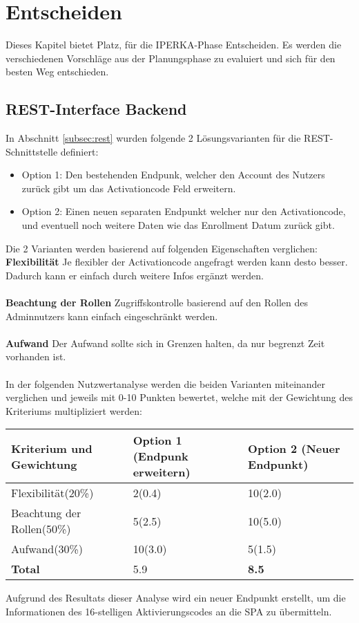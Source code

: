 \chapter{Entscheiden}\label{ch:entscheiden}
Dieses Kapitel bietet Platz, für die IPERKA-Phase \flqq Entscheiden\frqq{}. Es werden die verschiedenen Vorschläge aus der Planungsphase zu evaluiert und sich für den besten Weg entschieden.
\section{REST-Interface Backend}
In Abschnitt \ref{subsec:rest} wurden folgende 2 Lösungsvarianten für die REST-Schnittstelle definiert:
\begin{itemize}
	\item{Option 1:} Den bestehenden Endpunk, welcher den Account des Nutzers zurück gibt um das Activationcode Feld erweitern.
	\item{Option 2:} Einen neuen separaten Endpunkt welcher nur den Activationcode, und eventuell noch weitere Daten wie das Enrollment Datum zurück gibt.
\end{itemize}
Die 2 Varianten werden basierend auf folgenden Eigenschaften verglichen:
\newline\\
\textbf{Flexibilität} Je flexibler der Activationcode angefragt werden kann desto besser. Dadurch kann er einfach durch weitere Infos ergänzt werden.\\\\
\textbf{Beachtung der Rollen} Zugriffskontrolle basierend auf den Rollen des Adminnutzers kann einfach eingeschränkt werden.
\\\\
\textbf{Aufwand} Der Aufwand sollte sich in Grenzen halten, da nur begrenzt Zeit vorhanden ist.
\\
\\
In der folgenden Nutzwertanalyse werden die beiden Varianten miteinander verglichen und jeweils mit 0-10 Punkten bewertet, welche mit der Gewichtung des Kriteriums multipliziert werden:
\begin{longtable}{|p{}|p{}|p{}|}
	\hline
	\textbf{Kriterium und Gewichtung} & \textbf{Option 1 (Endpunk erweitern)} & \textbf{Option 2 (Neuer Endpunkt)} \\ \hline
	Flexibilität(20\%)& 2(0.4)  & 10(2.0)    \\ \hline 
	Beachtung der Rollen(50\%) & 5(2.5)  &  10(5.0)   \\ \hline 
	Aufwand(30\%) & 10(3.0)  &  5(1.5)   \\ \hline 
	\textbf{Total} & 5.9  &  \textbf{8.5} \\ \hline 
\end{longtable}
\noindent Aufgrund des Resultats dieser Analyse wird ein neuer Endpunkt erstellt, um die Informationen des 16-stelligen Aktivierungscodes an die SPA zu übermitteln.

